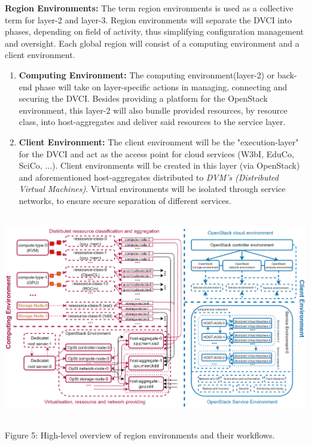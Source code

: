 \documentclass[]{article}
\begin{document}
\textbf{Region Environments:}
The term region environments is used as a collective term for layer-2 and layer-3. 
Region environments will separate the DVCI into phases, depending on field of activity, thus simplifying configuration management and oversight.
Each global region will consist of a computing environment and a client environment. 

\begin{enumerate}[label=\textbullet]
	\item\textbf{Computing Environment:}
	The computing environment(layer-2) or back-end phase will take on layer-specific actions in managing, connecting and securing the DVCI. 
	Besides providing a platform for the OpenStack environment, this layer-2 will also bundle provided resources, by resource class, into host-aggregates and deliver said resources to the service layer.  
	
	\item\textbf{Client Environment:} 
	The client environment will be the "execution-layer" for the DVCI and act as the access point for cloud services (W3bI, EduCo, SciCo, ...). 
	Client environments will be created in this layer (via OpenStack) and aforementioned host-aggregates distributed to \textit{DVM's (Distributed Virtual Machines)}.
	Virtual environments will be isolated through service networks, to ensure secure separation of different services. 
\end{enumerate}

\begin{center}
	\includegraphics[height=9cm]{region-environments}
\end{center}
\begin{center}
	Figure 5: High-level overview of region environments and their workflows.
\end{center}
\end{document}
